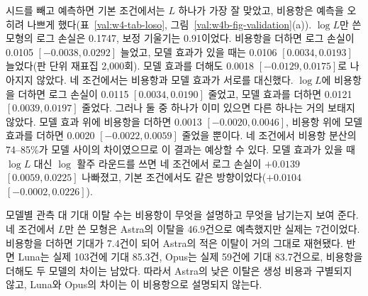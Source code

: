 시드를 빼고 예측하면 기본 조건에서는 $L$ 하나가 가장 잘 맞았고, 비용항은 예측을 오히려 나쁘게 했다(표~\ref{val:w4-tab-loso}, 그림~\ref{val:w4b-fig-validation}(a)). $\log L$만 쓴 모형의 로그 손실은 0.1747, 보정 기울기는 0.91이었다. 비용항을 더하면 로그 손실이 0.0105 $[-0.0038, 0.0292]$ 늘었고, 모델 효과가 있을 때는 0.0106 $[0.0034, 0.0193]$ 늘었다(판 단위 재표집 2,000회). 모델 효과를 더해도 0.0018 $[-0.0129, 0.0175]$로 나아지지 않았다. 네 조건에서는 비용항과 모델 효과가 서로를 대신했다. $\log L$에 비용항을 더하면 로그 손실이 0.0115 $[0.0034, 0.0190]$ 줄었고, 모델 효과를 더하면 0.0121 $[0.0039, 0.0197]$ 줄었다. 그러나 둘 중 하나가 이미 있으면 다른 하나는 거의 보태지 않았다. 모델 효과 위에 비용항을 더하면 0.0013 $[-0.0020, 0.0046]$, 비용항 위에 모델 효과를 더하면 0.0020 $[-0.0022, 0.0059]$ 줄었을 뿐이다. 네 조건에서 비용항 분산의 74--85\%가 모델 사이의 차이였으므로 이 결과는 예상할 수 있다. 모델 효과가 있을 때 $\log L$ 대신 $\log$ 활주 라운드를 쓰면 네 조건에서 로그 손실이 $+0.0139$ $[0.0059, 0.0225]$ 나빠졌고, 기본 조건에서도 같은 방향이었다($+0.0104$ $[-0.0002, 0.0226]$).

모델별 관측 대 기대 이탈 수는 비용항이 무엇을 설명하고 무엇을 남기는지 보여 준다. 네 조건에서 $L$만 쓴 모형은 Astra의 이탈을 46.9건으로 예측했지만 실제는 7건이었다. 비용항을 더하면 기대가 7.4건이 되어 Astra의 적은 이탈이 거의 그대로 재현됐다. 반면 Luna는 실제 103건에 기대 85.3건, Opus는 실제 59건에 기대 83.7건으로, 비용항을 더해도 두 모델의 차이는 남았다. 따라서 Astra의 낮은 이탈은 생성 비용과 구별되지 않고, Luna와 Opus의 차이는 이 비용항으로 설명되지 않는다.

\begin{table}[h]
\centering
\caption{같은 $L$에서의 쌍별 모델 대비(이탈 로그 오즈 차이, $C$가 낮은 모델에서 높은 모델을 뺀 값). 대괄호는 판 단위 군집 표준오차의 95\% 구간이고, $^{*}$는 열 쌍 Holm 보정 후 $p<0.05$다. 자기 이전 비용 열은 표~\ref{val:w4-tab-exit}에서 모델 효과 검정이 $p=0.184$였던 모형이다. 비용 3항은 표~\ref{val:w4-tab-loso}와 같다. 모두 전체 표본 적합이다.}
\label{val:w4-tab-contrast}
\small
\setlength{\tabcolsep}{3pt}
\resizebox{\linewidth}{!}{}
\end{table}

